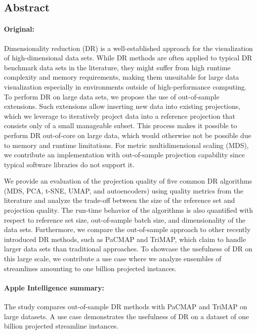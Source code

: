 \documentclass[a4paper,12pt]{article}
\begin{document}
\subsection{Abstract}

\paragraph{Original:} Dimensionality reduction (DR) is a well-established approach for the visualization of high-dimensional data sets. While DR methods
are often applied to typical DR benchmark data sets in the literature, they might suffer from high runtime complexity and memory requirements, making them unsuitable for large data visualization especially in environments outside of high-performance computing. To perform DR on large data sets, we propose the use of out-of-sample extensions. Such extensions allow inserting new data into
existing projections, which we leverage to iteratively project data into a reference projection that consists only of a small manageable subset. This process makes it possible to perform DR out-of-core on large data, which would otherwise not be possible due to memory and runtime limitations. For metric multidimensional scaling (MDS), we contribute an implementation with out-of-sample projection capability since typical software libraries do not support it.

We provide an evaluation of the projection quality of five common DR algorithms (MDS, PCA, t-SNE, UMAP, and autoencoders) using quality metrics from the literature and analyze the trade-off between the size of the reference set and projection quality. The run-time behavior of the algorithms is also quantified with respect to reference set size, out-of-sample batch size, and dimensionality of the data sets. Furthermore, we compare the out-of-sample approach to other recently introduced DR methods, such as PaCMAP and
TriMAP, which claim to handle larger data sets than traditional approaches. To showcase the usefulness of DR on this large scale, we contribute a use case where we analyze ensembles of streamlines amounting to one billion projected instances.

\paragraph{Apple Intelligence summary:} The study compares out-of-sample DR methods with PaCMAP and TriMAP on large datasets.  A use case demonstrates the usefulness of DR on a dataset of one billion projected streamline instances.
\end{document}
